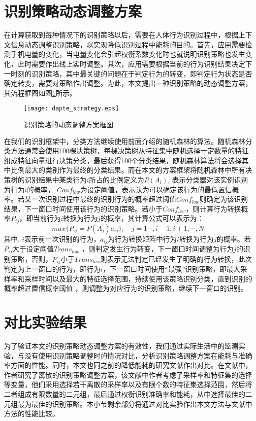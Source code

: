 \section{识别策略动态调整方案}
\par 在计算获取到每种情况下的识别策略以后，需要在人体行为识别过程中，根据上下文信息动态调整识别策略，以实现降低识别过程中能耗的目的。首先，应用需要检测手机电量的变化，当电量变化会引起权衡系数变化时也就说明识别策略也发生变化，此时需要作出线上实时调整。其次，应用需要根据当前的行为识别结果决定下一时刻的识别策略，其中最关键的问题在于判定行为的转变，即判定行为状态是否确定转变，需要对策略作出调整。为此，本文提出一种识别策略的动态调整方案，其流程框图如图\ref{dapte_strategy}所示。
\begin{figure}[htp]
\centering
\texttt{[image: dapte\_strategy.eps]}
\caption{识别策略的动态调整方案框图}\label{dapte_strategy}
\end{figure}

\par 在我们的识别框架中，分类方法继续使用前面介绍的随机森林的算法。随机森林分类方法通常会使用100棵决策树，每棵决策树从特征集中随机选择一定数量的特征组成特征向量进行决策分类，最后获得100个分类结果，随机森林算法将会选择其中比例最大的类别作为最终的分类结果。而在本文的方案框架将随机森林中所有决策树的识别结果中某类行为$i$所占的比例定义为$P(A_i)$, 表示分类器对该实例识别为行为$i$的概率， $Conf_{low}$为设定阈值，表示认为可以确定该行为的最低置信概率。若某一次识别过程中最终的识别行为的概率超过阈值$Conf_{low}$则确定为该识别结果，下一窗口时间使用该行为的识别策略。若小于$Conf_{low}$，则计算行为转换概率$P_{ij}$，即当前行为$i$转换为行为$j$的概率，其计算公式可以表示为：
\begin{equation}
	max \{P_{ij} = P(A_j)a_{ij}\}, \quad j = 1 \cdots, i-1, i+1, \cdots, N
\end{equation}
其中, $i$表示前一次识别的行为，$a_{ij}$为行为转换矩阵中行为$i$转换为行为$j$的概率。若$P_{ij}$大于设定阈值$Trans_{low}$ ，则判定发生行为转变，下一窗口时间调整为行为$j$的识别策略，否则，$P_{ij}$小于$Trans_{low}$则表示无法判定已经发生了明确的行为转换，此次判定为上一窗口的行为，即行为$i$，下一窗口时间使用“最强”识别策略，即最大采样率和采样时间以及最大的特征选择范围，持续使用该策略识别分类，直到识别的概率超过置信概率阈值 ，则调整为对应行为的识别策略，继续下一窗口的识别。

\section{对比实验结果}
\par 为了验证本文的识别策略动态调整方案的有效性，我们通过实际生活中的监测实验，与没有使用识别策略调整时的情况对比，分析识别策略调整方案在能耗与准确率方面的性能。同时，本文也同之前的降低能耗的研究文献作出对比。在文献\cite{modelVarialb}中，作者研究了离散的识别策略调整方案，该文献中作者考虑了采样率和特征集的选择等变量，他们采用选择若干离散的采样率以及有限个数的特征集选择范围，然后将二者组成有限数量的二元组，最后通过权衡识别准确率和能耗，从中选择最佳的二元组最为最佳的识别策略。本小节剩余部分将通过对比实验作出本文方法与文献中方法的性能比较。

